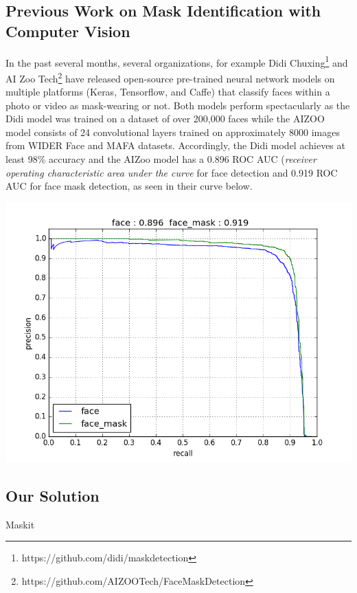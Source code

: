 \documentclass[conference, 12pt, onecolumn]{IEEEtran}
\begin{document}
\subsection{Previous Work on Mask Identification with Computer Vision}
In the past several months, several organizations, for example Didi Chuxing\footnote{https://github.com/didi/maskdetection} and AI Zoo Tech\footnote{https://github.com/AIZOOTech/FaceMaskDetection} have released open-source pre-trained neural network models on multiple platforms (Keras, Tensorflow, and Caffe) that classify faces within a photo or video as mask-wearing or not. Both models perform spectacularly as the Didi model was trained on a dataset of over 200,000 faces while the AIZOO model consists of 24 convolutional layers trained on approximately 8000 images from WIDER Face and MAFA datasets. Accordingly, the Didi model achieves at least 98\% accuracy and the AIZoo model has a 0.896 ROC AUC (\textit{receiver operating characteristic area under the curve} for face detection and 0.919 ROC AUC for face mask detection, as seen in their curve below.
\begin{center}
\includegraphics[scale=.5]{pr_curve}
\end{center}


\subsection{Our Solution}
Maskit 
\end{document}
